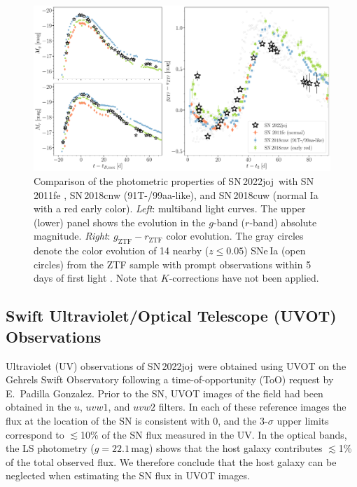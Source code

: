 \documentclass[twocolumn]{aastex631}
\newcommand{\sn}{SN\,2022joj}
\begin{document}
\begin{CJK*}{UTF8}{gbsn}
\begin{figure}
    \centering
    \includegraphics[width=\textwidth]{photometry.pdf}
    \caption{Comparison of the photometric properties of \sn\ with SN\,2011fe \citep[normal Ia;][]{Pereira_2013}, SN\,2018cnw (91T-/99aa-like), and SN\,2018cuw (normal Ia with a red early color). \textit{Left}: multiband light curves. The upper (lower) panel shows the evolution in the $g$-band ($r$-band) absolute magnitude. %
    \textit{Right}: $g_\mathrm{ZTF}-r_\mathrm{ZTF}$ color evolution. %
    The gray circles denote the color evolution of 14 nearby ($z\le0.05$) SNe\,Ia (open circles) from the ZTF sample with prompt observations within 5\,days of first light \citep{Bulla2020}. Note that $K$-corrections have not been applied.}
    \label{fig:lc}
\end{figure}

\subsection{Swift Ultraviolet/Optical Telescope (UVOT) Observations}
Ultraviolet (UV) observations of \sn\ were obtained using UVOT \citep{UVOT_2005} on the Gehrels Swift Observatory \citep[Swift;][]{Swift_2004} following a time-of-opportunity (ToO) request by E.~Padilla Gonzalez. Prior to the SN, UVOT images of the field had been obtained in the $u$, $uvw1$, and $uvw2$ filters. In each of these reference images the flux at the location of the SN is consistent with 0, and the 3-$\sigma$ upper limits correspond to $\lesssim$10\% of the SN flux measured in the UV. In the optical bands, the LS photometry ($g = 22.1$\,mag) shows that the host galaxy contributes $\lesssim$1\% of the total observed flux. We therefore conclude that the host galaxy can be neglected when estimating the SN flux in UVOT images.


\end{CJK*}
\end{document}
